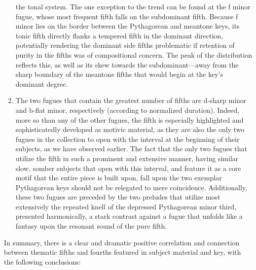 \begin{enumerate}
  the tonal system. The one exception to the trend can be found at the f
  minor fugue, whose most frequent fifth falls on the subdominant fifth.
  Because f minor lies on the border between the Pythagorean and
  meantone keys, its tonic fifth directly flanks a tempered fifth in the
  dominant direction, potentially rendering the dominant side fifths
  problematic if retention of purity in the fifths was of compositional
  concern. The peak of the distribution reflects this, as well as its
  skew towards the subdominant---away from the sharp boundary of the
  meantone fifths that would begin at the key's dominant degree.
\item
  The two fugues that contain the greatest number of fifths are d-sharp
  minor and b-flat minor, respectively (according to normalized
  duration). Indeed, more so than any of the other fugues, the fifth is
  especially highlighted and sophisticatedly developed as motivic
  material, as they are also the only two fugues in the collection to
  open with the interval at the beginning of their subjects, as we have
  observed earlier. The fact that the only two fugues that utilize the
  fifth in such a prominent and extensive manner, having similar slow,
  somber subjects that open with this interval, and feature it as a core
  motif that the entire piece is built upon, fall upon the two exemplar
  Pythagorean keys should not be relegated to mere coincidence.
  Additionally, these two fugues are preceded by the two preludes that
  utilize most extensively the repeated knell of the depressed
  Pythagorean minor third, presented harmonically, a stark contrast
  against a fugue that unfolds like a fantasy upon the resonant sound of
  the pure fifth.
\end{enumerate}


    \begin{center}
    \end{center}
    

    \begin{center}
    \end{center}
    
    In summary, there is a clear and dramatic positive correlation and
connection between thematic fifths and fourths featured in subject
material and key, with the following conclusions:

